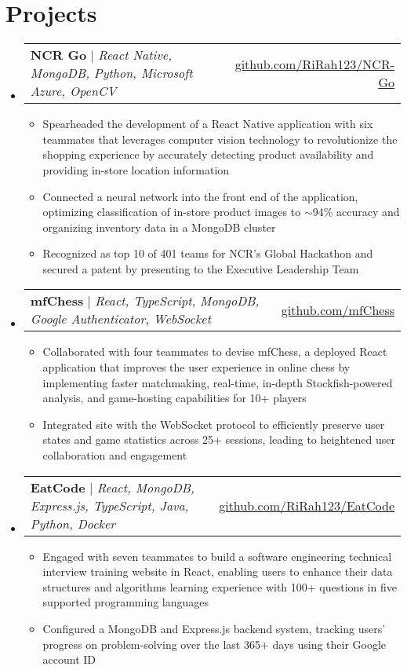 \documentclass[letterpaper,10pt]{article}
\makeatletter
\newcommand{\resumeItem}[1]{
  \item\small{
    {#1 \vspace{-2pt}}
  }
}
\newcommand{\resumeProjectHeading}[2]{
    \item
    \begin{tabular*}{0.97\textwidth}{l@{\extracolsep{\fill}}r}
      \small#1 & #2 \\
    \end{tabular*}\vspace{-7pt}
}
\newcommand{\resumeSubHeadingListStart}{\begin{itemize}[leftmargin=0.15in, label={}]}
\newcommand{\resumeSubHeadingListEnd}{\end{itemize}}
\newcommand{\resumeItemListStart}{\begin{itemize}}
\newcommand{\resumeItemListEnd}{\end{itemize}\vspace{-5pt}}
\makeatother
\begin{document}
\section{Projects}
    \resumeSubHeadingListStart
        \resumeProjectHeading
          {\textbf{NCR Go} $|$ \emph{React Native, MongoDB, Python, Microsoft Azure, OpenCV}}{\href{https://github.com/RiRah123/NCR-Go}{\underline{github.com/RiRah123/NCR-Go}}}
          \resumeItemListStart
            \resumeItem{Spearheaded the development of a React Native application with six teammates that leverages computer vision technology to revolutionize the shopping experience by accurately detecting product availability and providing in-store location information}
            \resumeItem{Connected a neural network into the front end of the application, optimizing classification of in-store product images to $\sim$94\% accuracy and organizing inventory data in a MongoDB cluster}
            \resumeItem{Recognized as top 10 of 401 teams for NCR's Global Hackathon and secured a patent by presenting to the Executive Leadership Team}
          \resumeItemListEnd

        \resumeProjectHeading
          {\textbf{mfChess} $|$ \emph{React, TypeScript, MongoDB, Google Authenticator, WebSocket}}{\href{https://github.com/mfChess}{\underline{github.com/mfChess}}}
          \resumeItemListStart
            \resumeItem{Collaborated with four teammates to devise mfChess, a deployed React application that improves the user experience in online chess by implementing faster matchmaking, real-time, in-depth Stockfish-powered analysis, and game-hosting capabilities for 10+ players}
            \resumeItem{Integrated site with the WebSocket protocol to efficiently preserve user states and game statistics across 25+ sessions, leading to heightened user collaboration and engagement}
          \resumeItemListEnd
          
      \resumeProjectHeading
          {\textbf{EatCode} $|$ \emph{React, MongoDB, Express.js, TypeScript, Java, Python, Docker}}{\href{https://github.com/RiRah123/EatCode}{\underline{github.com/RiRah123/EatCode}}}
          \resumeItemListStart
            \resumeItem{Engaged with seven teammates to build a software engineering technical interview training website in React, enabling users to enhance their data structures and algorithms learning experience with 100+ questions in five supported programming languages}
            \resumeItem{Configured a MongoDB and Express.js backend system, tracking users' progress on problem-solving over the last 365+ days using their Google account ID}
          \resumeItemListEnd
    \resumeSubHeadingListEnd
\end{document}
